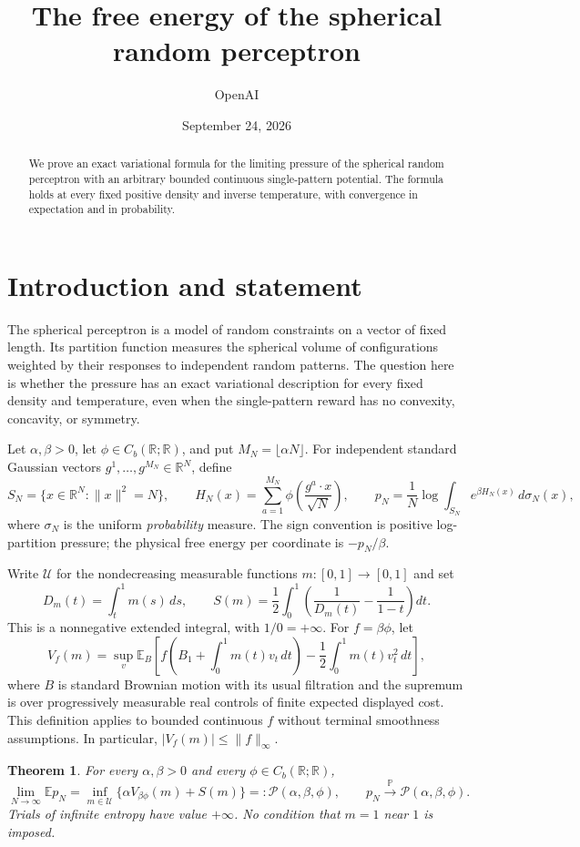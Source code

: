\documentclass[11pt]{article}
\title{The free energy of the spherical random perceptron}
\author{OpenAI}
\date{September 24, 2026}
\newtheorem{theorem}{Theorem}
\newcommand{\R}{\mathbb R}
\newcommand{\E}{\mathbb E}
\newcommand{\U}{\mathcal U}
\begin{document}
\maketitle
\begin{abstract}
We prove an exact variational formula for the limiting pressure of the spherical
random perceptron with an arbitrary bounded continuous single-pattern potential.
The formula holds at every fixed positive density and inverse temperature,
with convergence in expectation and in probability.
\end{abstract}

\section{Introduction and statement}
The spherical perceptron is a model of random constraints on a vector of fixed
length. Its partition function measures the spherical volume of configurations
weighted by their responses to independent random patterns. The question here
is whether the pressure has an exact variational description for every fixed
density and temperature, even when the single-pattern reward has no convexity,
concavity, or symmetry.

Let $\alpha,\beta>0$, let $\phi\in C_b(\R;\R)$, and put $M_N=\lfloor\alpha N\rfloor$.
For independent standard Gaussian vectors $g^1,\ldots,g^{M_N}\in\R^N$, define
\[
 S_N=\{x\in\R^N:\|x\|^2=N\},\qquad
 H_N(x)=\sum_{a=1}^{M_N}\phi\left(\frac{g^a\cdot x}{\sqrt N}\right),
 \qquad
 p_N=\frac1N\log\int_{S_N}e^{\beta H_N(x)}\,d\sigma_N(x),
\]
where $\sigma_N$ is the uniform \emph{probability} measure. The sign convention is
positive log-partition pressure; the physical free energy per coordinate is
$-p_N/\beta$.

Write $\U$ for the nondecreasing measurable functions $m:[0,1]\to[0,1]$ and set
\[
 D_m(t)=\int_t^1m(s)\,ds,\qquad
 S(m)=\frac12\int_0^1\left(\frac1{D_m(t)}-\frac1{1-t}\right)dt.
\]
This is a nonnegative extended integral, with $1/0=+\infty$. For $f=\beta\phi$,
let
\[
 V_f(m)=\sup_v\E_B\left[
 f\left(B_1+\int_0^1m(t)v_t\,dt\right)
 -\frac12\int_0^1m(t)v_t^2\,dt\right],
\]
where $B$ is standard Brownian motion with its usual filtration and the supremum
is over progressively measurable real controls of finite expected displayed
cost. This definition applies to bounded continuous $f$ without terminal
smoothness assumptions. In particular, $|V_f(m)|\le\|f\|_\infty$.

\begin{theorem}\label{thm:main}
For every $\alpha,\beta>0$ and every $\phi\in C_b(\R;\R)$,
\[
 \lim_{N\to\infty}\E p_N
 =\inf_{m\in\U}\{\alpha V_{\beta\phi}(m)+S(m)\}
 =:\mathcal P(\alpha,\beta,\phi),
 \qquad
 p_N\xrightarrow{\mathbb P}\mathcal P(\alpha,\beta,\phi).
\]
Trials of infinite entropy have value $+\infty$. No condition that $m=1$ near
$1$ is imposed.
\end{theorem}
\end{document}
